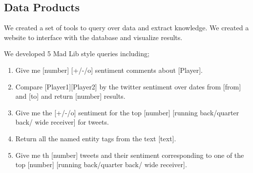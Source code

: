\documentclass[11pt,onecolumn]{article}
\newcommand{\system}{MADden\xspace}
\begin{document}



  \subsection{Data Products}

	We created a set of tools to query over data and extract knowledge.
	We created a website to interface with the database and visualize results.

	We developed 5  Mad Lib style queries including;
	\begin{enumerate}
	\item Give me [number] [+/-/o] sentiment comments about [Player].
	\item Compare [Player1][Player2] by the twitter sentiment	over dates from
	[from] and [to] and return [number] results.
	\item Give me the [+/-/o] sentiment for the top [number] 
	[running back/quarter back/ wide receiver] for tweets.
	\item Return all the named entity tags from the text [text].
	\item Give me th [number] tweets and their sentiment corresponding to 
	one of the top [number]  [running back/quarter back/ wide receiver].
	\end{enumerate}
\end{document}
